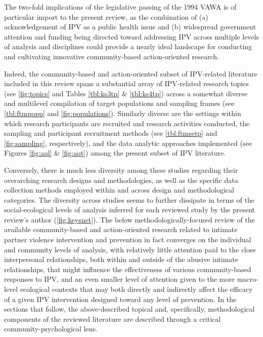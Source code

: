 \documentclass[11pt,]{tufte-book}
\begin{document}
The two-fold implications of the legislative passing of the 1994 VAWA is
of particular import to the present review, as the combination of (a)
acknowledgement of IPV as a public health issue and (b) widespread
government attention and funding being directed toward addressing IPV
across multiple levels of analysis and disciplines could provide a
nearly ideal landscape for conducting and cultivating innovative
community-based action-oriented research.

Indeed, the community-based and action-oriented subset of IPV-related
literature included in this review spans a substantial array of
IPV-related research topics (see \cref{fig:topics} and
Tables \ref{tbl:ks3tp} \& \ref{tbl:ks4tp}) across a somewhat diverse and
multilevel compilation of target populations and sampling frames (see
\cref{tbl:ftmpopp} and
\cref{fig:populations}). Similarly diverse are the
settings within which research participants are recruited and research
activities conducted, the sampling and participant recruitment methods
(see \cref{tbl:ftmsetp} and
\cref{fig:sampling}, respectively), and the data
analytic approaches implemented (see Figures \ref{fig:aql} \&
\ref{fig:aqt}) among the present subset of IPV literature.

Conversely, there is much less diversity among these studies regarding
their overarching research designs and methodologies, as well as the
specific data collection methods employed within and across design and
methodological categories. The diversity across studies seems to further
dissipate in terms of the social-ecological levels of analysis inferred
for each reviewed study by the present review's author
(\cref{fig:keysnet}). The below
methodologically-focused review of the available community-based and
action-oriented research related to intimate partner violence
intervention and prevention in fact converges on the individual and
community levels of analysis, with relatively little attention paid to
the close interpersonal relationships, both within and outside of the
abusive intimate relationships, that might influence the effectiveness
of various community-based responses to IPV, and an even smaller level
of attention given to the more macro-level ecological contexts that may
both directly and indirectly affect the efficacy of a given IPV
intervention designed toward any level of prevention. In the sections
that follow, the above-described topical and, specifically,
methodological components of the reviewed literature are described
through a critical community-psychological lens.
\end{document}
